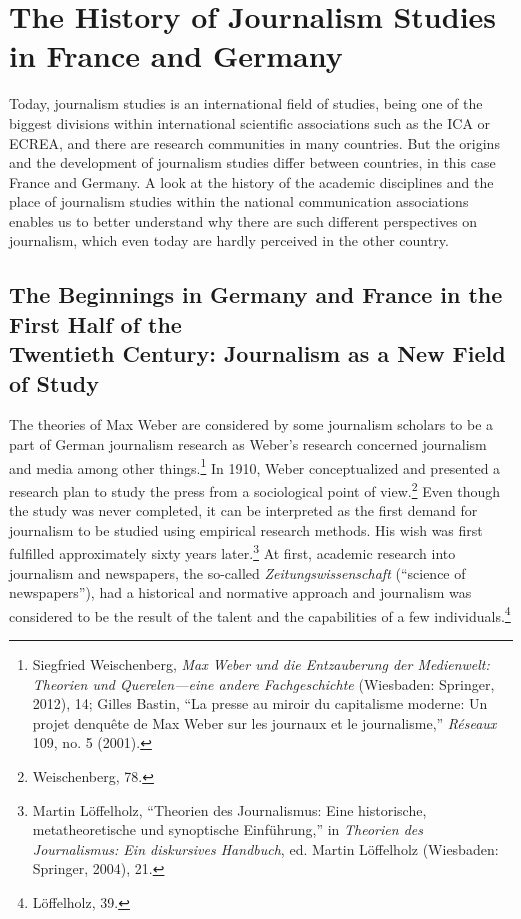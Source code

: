 \documentclass{tufte-handout}
\begin{document}
\hypertarget{the-history-of-journalism-studies-in-france-and-germany}{%
\section{The History of Journalism Studies in France and
Germany}\label{the-history-of-journalism-studies-in-france-and-germany}}

Today, journalism studies is an international field of studies, being
one of the biggest divisions within international scientific
associations such as the ICA or ECREA, and there are research
communities in many countries. But the origins and the development of
journalism studies differ between countries, in this case France and
Germany. A look at the history of the academic disciplines and the place
of journalism studies within the national communication associations
enables us to better understand why there are such different
perspectives on journalism, which even today are hardly perceived in the
other country.

\hypertarget{the-beginnings-in-germany-and-france-in-the-first-half-of-the-twentieth-century-journalism-as-a-new-field-of-study}{%
\subsection{The Beginnings in Germany and
France in the First Half of the\\\noindent Twentieth Century: Journalism as a New
Field of
Study}\label{the-beginnings-in-germany-and-france-in-the-first-half-of-the-twentieth-century-journalism-as-a-new-field-of-study}}

The theories of Max Weber are considered by some journalism scholars to
be a part of German journalism research as Weber's research concerned
journalism and media among other things.\footnote{Siegfried
  Weischenberg, \emph{Max Weber und die Entzauberung der Medienwelt:
  Theorien und Querelen---eine andere Fachgeschichte} (Wiesbaden:
  Springer, 2012), 14; Gilles Bastin, ``La presse au miroir du
  capitalisme moderne: Un projet d\textquotesingle enquête de Max Weber
  sur les journaux et le journalisme,'' \emph{Réseaux} 109, no. 5
  (2001).} In 1910, Weber conceptualized and presented a research plan
to study the press from a sociological point of view.\footnote{Weischenberg,
  78.} Even though the study was never completed, it can be interpreted
as the first demand for journalism to be studied using empirical
research methods. His wish was first fulfilled approximately sixty years
later.\footnote{Martin Löffelholz, ``Theorien des Journalismus: Eine
  historische, metatheoretische und synoptische Einführung,'' in
  \emph{Theorien des Journalismus: Ein diskursives Handbuch}, ed. Martin
  Löffelholz (Wiesbaden: Springer, 2004), 21.} At first, academic
research into journalism and newspapers, the so-called
\emph{Zeitungswissenschaft} (``science of newspapers''), had a
historical and normative approach and journalism was considered to be
the result of the talent and the capabilities of a few
individuals.\footnote{Löffelholz, 39.}
\end{document}

